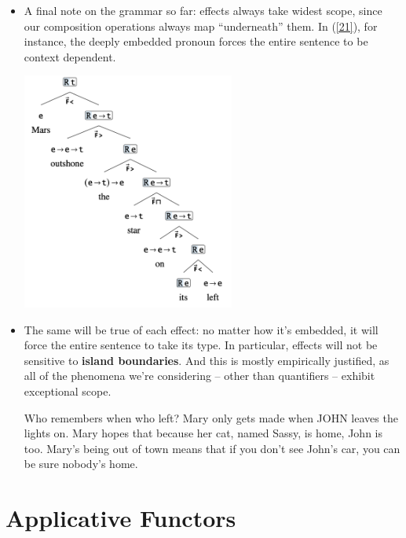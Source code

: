 \documentclass{article}
\begin{document}
\begin{itemize}
\begin{exe}
\begin{center}
      \end{center}
  \end{exe}
  \item A final note on the grammar so far: effects always take widest scope, since our composition operations always map ``underneath'' them.
    In (\ref{21}), for instance, the deeply embedded pronoun forces the entire sentence to be context dependent.
  \begin{exe}
    \ex \label{21} \hfill
      \begin{center}
        \includegraphics[width=7cm]{clips/21.png}
      \end{center}
  \end{exe}
  \item The same will be true of each effect: no matter how it's embedded, it will force the entire sentence to take its type. In particular,
    effects will not be sensitive to \textbf{island boundaries}. And this is mostly empirically justified, as all of the phenomena we're
    considering -- other than quantifiers -- exhibit exceptional scope.
    \begin{exe}
      \ex Who remembers when who left?
      \ex Mary only gets made when JOHN leaves the lights on.
      \ex Mary hopes that because her cat, named Sassy, is home, John is too.
      \ex Mary's being out of town means that if you don't see John's car, you can be sure nobody's home.
    \end{exe}
\end{itemize}

\pagebreak

\section{Applicative Functors}
\end{document}
